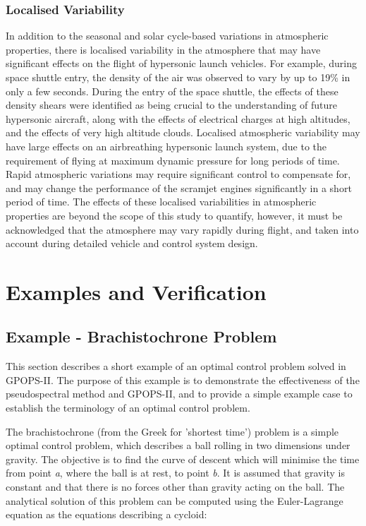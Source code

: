 \subsection{Localised Variability}

In addition to the seasonal and solar cycle-based variations in atmospheric properties, there is localised variability in the atmosphere that may have significant effects on the flight of hypersonic launch vehicles. For example, during space shuttle entry, the density of the air was observed to vary by up to 19\% in only a few seconds\cite{Hale2002}. During the entry of the space shuttle, the effects of these density shears were identified as being crucial to the understanding of future hypersonic aircraft, along with the effects of electrical charges at high altitudes, and the effects of very high altitude clouds. Localised atmospheric variability may have large effects on an airbreathing hypersonic launch system, due to the requirement of flying at maximum dynamic pressure for long periods of time. Rapid atmospheric variations may require significant control to compensate for, and may change the performance of the scramjet engines significantly in a short period of time. The effects of these localised variabilities in atmospheric properties are beyond the scope of this study to quantify, however, it must be acknowledged that the atmosphere may vary rapidly during flight, and taken into account during detailed vehicle and control system design. 
	




	


\chapter{Examples and Verification}

\section{Example - Brachistochrone Problem}

This section describes a short example of an optimal control problem solved in GPOPS-II. The purpose of this example is to demonstrate the effectiveness of the pseudospectral method and GPOPS-II, and to provide a simple example case to establish the terminology of an optimal control problem.  


The brachistochrone (from the Greek for 'shortest time') problem is a simple optimal control problem, which describes a ball rolling in two dimensions under gravity. The objective is to find the curve of descent which will minimise the time from point \textit{a}, where the ball is at rest, to point \textit{b}. It is assumed that gravity is constant and that there is no forces other than gravity acting on the ball. 
The analytical solution of this problem can be computed using the Euler-Lagrange equation as the equations describing a cycloid:

